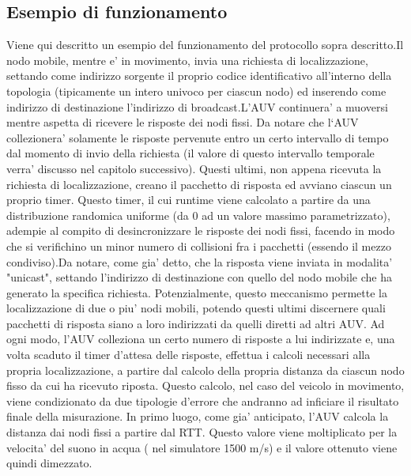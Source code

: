 \documentclass[Lau,binding=0.6cm]{sapthesis}
\begin{document}
\subsection{Esempio di funzionamento}
Viene qui descritto un esempio del funzionamento del protocollo sopra descritto.\newline Il nodo mobile, mentre e' in movimento, invia una richiesta di localizzazione, settando come indirizzo sorgente il proprio codice identificativo all'interno della topologia (tipicamente un intero univoco per ciascun nodo)
ed inserendo come indirizzo di destinazione l'indirizzo di broadcast.\newline L'AUV continuera' a muoversi mentre aspetta di ricevere le risposte dei nodi fissi. Da notare che l`AUV collezionera' solamente le risposte pervenute entro un certo intervallo di tempo dal momento di invio della richiesta (il valore di questo intervallo temporale verra' discusso nel capitolo successivo).\newline
Questi ultimi, non appena ricevuta la richiesta di localizzazione, creano il pacchetto di risposta ed avviano ciascun un proprio timer. Questo timer, il cui runtime viene calcolato a partire da una distribuzione randomica uniforme (da 0 ad un valore massimo parametrizzato), adempie al compito di desincronizzare le risposte dei nodi fissi,
facendo in modo che si verifichino un minor numero di collisioni fra i pacchetti (essendo il mezzo condiviso).\newline Da notare, come gia' detto, che la risposta viene inviata in modalita' "unicast", settando l'indirizzo di destinazione con quello del nodo mobile che ha generato la specifica richiesta. Potenzialmente, questo meccanismo permette la localizzazione di due o piu' nodi mobili, potendo questi ultimi discernere quali pacchetti di risposta siano a loro indirizzati da quelli diretti ad altri AUV.\newline
Ad ogni modo, l'AUV colleziona un certo numero di risposte a lui indirizzate e, una volta scaduto il timer d'attesa delle risposte, effettua i calcoli necessari alla propria localizzazione, a partire dal calcolo della propria distanza da ciascun nodo fisso da cui ha ricevuto riposta.\newline
Questo calcolo, nel caso del veicolo in movimento, viene condizionato da due tipologie d'errore che andranno ad inficiare il risultato finale della misurazione. 
In primo luogo, come gia' anticipato, l'AUV calcola la distanza dai nodi fissi a partire dal RTT. Questo valore viene moltiplicato per la velocita' del suono in acqua ( nel simulatore 1500 m/s) e il valore ottenuto viene quindi dimezzato.
\end{document}
